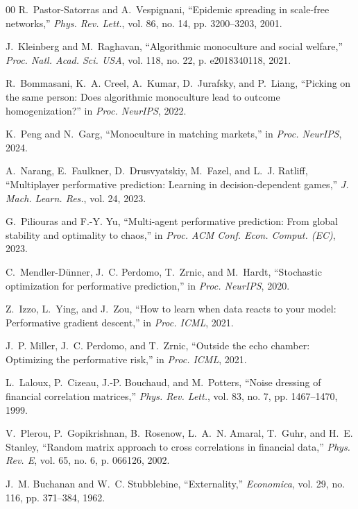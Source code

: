\documentclass[conference]{IEEEtran}
\theoremstyle{definition}
\begin{document}
\begin{thebibliography}{00}
 R.~Pastor-Satorras and A.~Vespignani, ``Epidemic
spreading in scale-free networks,'' \emph{Phys. Rev. Lett.}, vol. 86, no. 14,
pp. 3200--3203, 2001.

 J.~Kleinberg and M.~Raghavan, ``Algorithmic
monoculture and social welfare,'' \emph{Proc. Natl. Acad. Sci. USA}, vol. 118,
no. 22, p. e2018340118, 2021.

 R.~Bommasani, K.~A. Creel, A.~Kumar, D.~Jurafsky, and
P.~Liang, ``Picking on the same person: Does algorithmic monoculture lead to
outcome homogenization?'' in \emph{Proc. NeurIPS}, 2022.

 K.~Peng and N.~Garg, ``Monoculture in matching markets,''
in \emph{Proc. NeurIPS}, 2024.

 A.~Narang, E.~Faulkner, D.~Drusvyatskiy, M.~Fazel, and
L.~J. Ratliff, ``Multiplayer performative prediction: Learning in
decision-dependent games,'' \emph{J. Mach. Learn. Res.}, vol. 24, 2023.

 G.~Piliouras and F.-Y. Yu, ``Multi-agent performative
prediction: From global stability and optimality to chaos,'' in \emph{Proc.
ACM Conf. Econ. Comput. (EC)}, 2023.

 C.~Mendler-D\"unner, J.~C. Perdomo, T.~Zrnic, and
M.~Hardt, ``Stochastic optimization for performative prediction,'' in
\emph{Proc. NeurIPS}, 2020.

 Z.~Izzo, L.~Ying, and J.~Zou, ``How to learn when data
reacts to your model: Performative gradient descent,'' in \emph{Proc. ICML},
2021.

 J.~P. Miller, J.~C. Perdomo, and T.~Zrnic, ``Outside the
echo chamber: Optimizing the performative risk,'' in \emph{Proc. ICML}, 2021.

 L.~Laloux, P.~Cizeau, J.-P. Bouchaud, and M.~Potters,
``Noise dressing of financial correlation matrices,'' \emph{Phys. Rev. Lett.},
vol. 83, no. 7, pp. 1467--1470, 1999.

 V.~Plerou, P.~Gopikrishnan, B.~Rosenow, L.~A.~N. Amaral,
T.~Guhr, and H.~E. Stanley, ``Random matrix approach to cross correlations in
financial data,'' \emph{Phys. Rev. E}, vol. 65, no. 6, p. 066126, 2002.

 J.~M. Buchanan and W.~C. Stubblebine, ``Externality,''
\emph{Economica}, vol. 29, no. 116, pp. 371--384, 1962.


\end{thebibliography}
\end{document}
